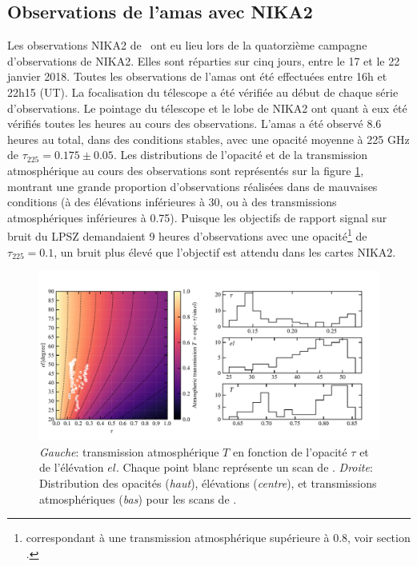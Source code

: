 \subsection{Observations de l'amas avec NIKA2}\label{subsec:act:nk2}

Les observations NIKA2 de \act\ ont eu lieu lors de la quatorzième campagne d'observations de NIKA2.
Elles sont réparties sur cinq jours, entre le 17 et le 22 janvier 2018.
Toutes les observations de l'amas ont été effectuées entre 16h et 22h15 (UT).
La focalisation du télescope a été vérifiée au début de chaque série d'observations.
Le pointage du télescope et le lobe de NIKA2 ont quant à eux été vérifiés toutes les heures au cours des observations.
L'amas a été observé 8.6 heures au total, dans des conditions stables, avec une opacité moyenne à 225 GHz de $\tau_{225} = 0.175 \pm 0.05$.
Les distributions de l'opacité et de la transmission atmosphérique au cours des observations sont représentés sur la figure \ref{fig:act:scans}, montrant une grande proportion d'observations réalisées dans de mauvaises conditions (à des élévations inférieures à 30\textdegree, ou à des transmissions atmosphériques inférieures à 0.75).
Puisque les objectifs de rapport signal sur bruit du LPSZ demandaient 9 heures d'observations avec une opacité\footnote{correspondant à une transmission atmosphérique supérieure à 0.8, voir section .} de $\tau_{225} = 0.1$, un bruit plus élevé que l'objectif est attendu dans les cartes NIKA2.

\begin{figure}[t]
    \centering
    \includegraphics[width=\linewidth]{Figures/Chap_actj0215/scans.pdf}
    \caption{
        \textit{Gauche}: transmission atmosphérique $T$ en fonction de l'opacité $\tau$ et de l'élévation $el$.
        Chaque point blanc représente un scan de \act.
        \textit{Droite}: Distribution des opacités (\textit{haut}), élévations (\textit{centre}), et transmissions atmosphériques (\textit{bas}) pour les scans de \act.
    }
    \label{fig:act:scans}
\end{figure}

